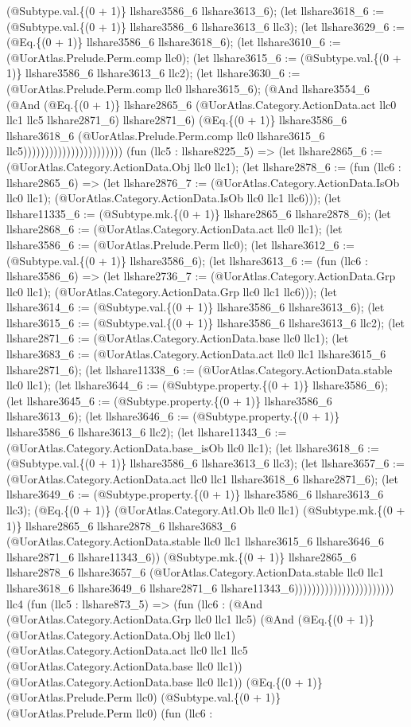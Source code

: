 \documentclass[11pt]{article}
\begin{document}
(@Subtype.val.\{(0 + 1)\} llshare3586\_6 llshare3613\_6); (let llshare3618\_6 := (@Subtype.val.\{(0 + 1)\} llshare3586\_6 llshare3613\_6 llc3); (let llshare3629\_6 := (@Eq.\{(0 + 1)\} llshare3586\_6 llshare3618\_6); (let llshare3610\_6 := (@UorAtlas.Prelude.Perm.comp llc0); (let llshare3615\_6 := (@Subtype.val.\{(0 + 1)\} llshare3586\_6 llshare3613\_6 llc2); (let llshare3630\_6 := (@UorAtlas.Prelude.Perm.comp llc0 llshare3615\_6); (@And llshare3554\_6 (@And (@Eq.\{(0 + 1)\} llshare2865\_6 (@UorAtlas.Category.ActionData.act llc0 llc1 llc5 llshare2871\_6) llshare2871\_6) (@Eq.\{(0 + 1)\} llshare3586\_6 llshare3618\_6 (@UorAtlas.Prelude.Perm.comp llc0 llshare3615\_6 llc5))))))))))))))))))))))) (fun (llc5 : llshare8225\_5) => (let llshare2865\_6 := (@UorAtlas.Category.ActionData.Obj llc0 llc1); (let llshare2878\_6 := (fun (llc6 : llshare2865\_6) => (let llshare2876\_7 := (@UorAtlas.Category.ActionData.IsOb llc0 llc1); (@UorAtlas.Category.ActionData.IsOb llc0 llc1 llc6))); (let llshare11335\_6 := (@Subtype.mk.\{(0 + 1)\} llshare2865\_6 llshare2878\_6); (let llshare2868\_6 := (@UorAtlas.Category.ActionData.act llc0 llc1); (let llshare3586\_6 := (@UorAtlas.Prelude.Perm llc0); (let llshare3612\_6 := (@Subtype.val.\{(0 + 1)\} llshare3586\_6); (let llshare3613\_6 := (fun (llc6 : llshare3586\_6) => (let llshare2736\_7 := (@UorAtlas.Category.ActionData.Grp llc0 llc1); (@UorAtlas.Category.ActionData.Grp llc0 llc1 llc6))); (let llshare3614\_6 := (@Subtype.val.\{(0 + 1)\} llshare3586\_6 llshare3613\_6); (let llshare3615\_6 := (@Subtype.val.\{(0 + 1)\} llshare3586\_6 llshare3613\_6 llc2); (let llshare2871\_6 := (@UorAtlas.Category.ActionData.base llc0 llc1); (let llshare3683\_6 := (@UorAtlas.Category.ActionData.act llc0 llc1 llshare3615\_6 llshare2871\_6); (let llshare11338\_6 := (@UorAtlas.Category.ActionData.stable llc0 llc1); (let llshare3644\_6 := (@Subtype.property.\{(0 + 1)\} llshare3586\_6); (let llshare3645\_6 := (@Subtype.property.\{(0 + 1)\} llshare3586\_6 llshare3613\_6); (let llshare3646\_6 := (@Subtype.property.\{(0 + 1)\} llshare3586\_6 llshare3613\_6 llc2); (let llshare11343\_6 := (@UorAtlas.Category.ActionData.base\_isOb llc0 llc1); (let llshare3618\_6 := (@Subtype.val.\{(0 + 1)\} llshare3586\_6 llshare3613\_6 llc3); (let llshare3657\_6 := (@UorAtlas.Category.ActionData.act llc0 llc1 llshare3618\_6 llshare2871\_6); (let llshare3649\_6 := (@Subtype.property.\{(0 + 1)\} llshare3586\_6 llshare3613\_6 llc3); (@Eq.\{(0 + 1)\} (@UorAtlas.Category.Atl.Ob llc0 llc1) (@Subtype.mk.\{(0 + 1)\} llshare2865\_6 llshare2878\_6 llshare3683\_6 (@UorAtlas.Category.ActionData.stable llc0 llc1 llshare3615\_6 llshare3646\_6 llshare2871\_6 llshare11343\_6)) (@Subtype.mk.\{(0 + 1)\} llshare2865\_6 llshare2878\_6 llshare3657\_6 (@UorAtlas.Category.ActionData.stable llc0 llc1 llshare3618\_6 llshare3649\_6 llshare2871\_6 llshare11343\_6))))))))))))))))))))))) llc4 (fun (llc5 : llshare873\_5) => (fun (llc6 : (@And (@UorAtlas.Category.ActionData.Grp llc0 llc1 llc5) (@And (@Eq.\{(0 + 1)\} (@UorAtlas.Category.ActionData.Obj llc0 llc1) (@UorAtlas.Category.ActionData.act llc0 llc1 llc5 (@UorAtlas.Category.ActionData.base llc0 llc1)) (@UorAtlas.Category.ActionData.base llc0 llc1)) (@Eq.\{(0 + 1)\} (@UorAtlas.Prelude.Perm llc0) (@Subtype.val.\{(0 + 1)\} (@UorAtlas.Prelude.Perm llc0) (fun (llc6 : 
\end{document}
